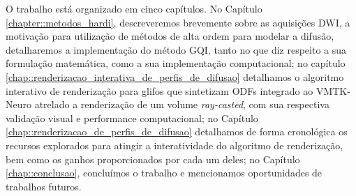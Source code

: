 \documentclass[
    12pt,                %
    oneside,            %
    a4paper,            %
    english,            %
    french,                %
    spanish,            %
    brazil                %
    ]{abntex2}
\begin{document}
O trabalho está organizado em cinco capítulos. No Capítulo \ref{chapter::metodos_hardi}, descreveremos brevemente sobre as aquisições DWI, a motivação para utilização de métodos de alta ordem para modelar a difusão, detalharemos a implementação do método GQI, tanto no que diz respeito a sua formulação matemática, como a sua implementação computacional; no capítulo \ref{chap::renderizacao_interativa_de_perfis_de_difusao} detalhamos o algoritmo interativo de renderização para glifos que sintetizam ODFs integrado ao VMTK-Neuro atrelado a renderização de um volume \textit{ray-casted}, com sua respectiva validação visual e performance computacional; no Capítulo \ref{chap::renderizacao_de_perfis_de_difusao} detalhamos de forma cronológica os recursos explorados para atingir a interatividade do algoritmo de renderização, bem como os ganhos proporcionados por cada um deles; no Capítulo \ref{chap::conclusao}, concluímos o trabalho e mencionamos oportunidades de trabalhos futuros.











%
\end{document}
